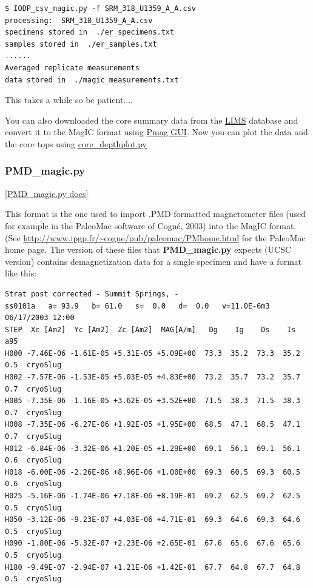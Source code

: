 \documentclass[11pt]{book}
\begin{document}
{{\begin{verbatim}
$ IODP_csv_magic.py -f SRM_318_U1359_A_A.csv
processing:  SRM_318_U1359_A_A.csv
specimens stored in  ./er_specimens.txt
samples stored in  ./er_samples.txt
......
Averaged replicate measurements
data stored in  ./magic_measurements.txt
\end{verbatim}

This takes a while so be patient....

You can also downloaded the {core summary} data from the \href{#LIMS} {LIMS} database and convert it to the MagIC format using \href{#pmag_gui.py}{Pmag GUI}.
Now you can plot the data and the core tops using \href{#core_depthplot.py}{core\_depthplot.py}



\subsubsection{PMD\_magic.py}
\href{https://github.com/PmagPy/PmagPy/blob/master/programs/PMD_magic.py}{[PMD\_magic.py docs]}

This format is the one used to import  .PMD formatted magnetometer files (used for example in the PaleoMac software of Cogn\'e, 2003) \nocite{cogne03} into the MagIC format.  (See \url{http://www.ipgp.fr/~cogne/pub/paleomac/PMhome.html} for the PaleoMac home page.
The version of these files that {\bf PMD\_magic.py} expects (UCSC version) contains demagnetization data for a single specimen and have a format like this:

\begin{verbatim}
Strat post corrected - Summit Springs, -
ss0101a   a= 93.9   b= 61.0   s=  0.0   d=  0.0   v=11.0E-6m3  06/17/2003 12:00
STEP  Xc [Am2]  Yc [Am2]  Zc [Am2]  MAG[A/m]   Dg    Ig    Ds    Is  a95
H000 -7.46E-06 -1.61E-05 +5.31E-05 +5.09E+00  73.3  35.2  73.3  35.2  0.5  cryoSlug
H002 -7.57E-06 -1.53E-05 +5.03E-05 +4.83E+00  73.2  35.7  73.2  35.7  0.7  cryoSlug
H005 -7.35E-06 -1.16E-05 +3.62E-05 +3.52E+00  71.5  38.3  71.5  38.3  0.7  cryoSlug
H008 -7.35E-06 -6.27E-06 +1.92E-05 +1.95E+00  68.5  47.1  68.5  47.1  0.7  cryoSlug
H012 -6.84E-06 -3.32E-06 +1.20E-05 +1.29E+00  69.1  56.1  69.1  56.1  0.6  cryoSlug
H018 -6.00E-06 -2.26E-06 +8.96E-06 +1.00E+00  69.3  60.5  69.3  60.5  0.6  cryoSlug
H025 -5.16E-06 -1.74E-06 +7.18E-06 +8.19E-01  69.2  62.5  69.2  62.5  0.5  cryoSlug
H050 -3.12E-06 -9.23E-07 +4.03E-06 +4.71E-01  69.3  64.6  69.3  64.6  0.5  cryoSlug
H090 -1.80E-06 -5.32E-07 +2.23E-06 +2.65E-01  67.6  65.6  67.6  65.6  0.5  cryoSlug
H180 -9.49E-07 -2.94E-07 +1.21E-06 +1.42E-01  67.7  64.8  67.7  64.8  0.5  cryoSlug
\end{verbatim}

}}
\end{document}
